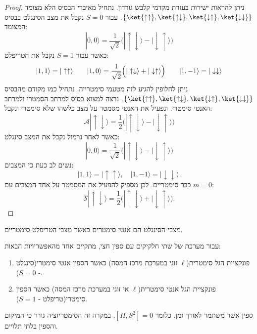 \documentclass{tstextbook}
\begin{document}
\begin{proof}
ניתן להראות ישירות בעזרת מקדמי קלבש גורדון. נתחיל מאיברי הבסיס הלא מצומד \(\{ \ket{\uparrow\uparrow},\ket{\uparrow\downarrow},\ket{\downarrow\uparrow},\ket{\downarrow\downarrow} \}\). עבור \(S=0\) נקבל את מצב הסינגלט בבסיס המצומד:
$$|0,0\rangle=\frac{1}{\sqrt{2}}\Big(|\uparrow\downarrow\rangle-|\downarrow\uparrow\rangle\Big)$$
כאשר עבור \(S=1\) נקבל את הטריפלט:
$$|1,1\rangle=|\uparrow\uparrow\rangle \qquad |1,0\rangle=\frac{1}{\sqrt{2}}\Bigl(|\uparrow\downarrow\rangle+|\downarrow\uparrow\rangle\Bigr)\qquad |1,-1\rangle=|\downarrow\downarrow\rangle$$
ניתן לחלופין להגיע לזה מטעמי סימטרייה. נתחיל כמו מקודם מהבסיס \(\{ \ket{\uparrow\uparrow},\ket{\uparrow\downarrow},\ket{\downarrow\uparrow},\ket{\downarrow\downarrow} \}\). נרצה למצוא בסיס למרחב הסמטרי ולמרחב האנטי סימטרי. ונפעיל את האנטי מסמטר על מצב כלשהו שלא סימטרי ונקבל:
$${\mathcal{A}}|\uparrow\downarrow\rangle={\frac{1}{2}}{\Big(}|\uparrow\downarrow\rangle-|\downarrow\uparrow\rangle{\Big)}$$
כאשר לאחר נרמול נקבל את המצב סינגלט:
$$|0,0\rangle=\frac{1}{\sqrt{2}}\Big(|\!\uparrow\downarrow\rangle-|\!\downarrow\uparrow\rangle\Big)$$
נשים לב כעת כי המצבים:
$$|1,1\rangle=|\!\uparrow\uparrow\rangle,\quad|1,-1\rangle=|\!\downarrow\downarrow\rangle.$$
כבר סימטריים. לכן מספיק להפעיל את המסמטר על אחד המצבים עם \(m=0\):
$${\mathcal{S}}|\!\uparrow\downarrow\rangle={\frac{1}{2}}{\Big(}|\!\uparrow\downarrow\rangle+|\!\downarrow\uparrow\rangle{\Big)}.$$

\end{proof}
\begin{corollary}
מצבי הסינגלט הם אנטי סימטרים כאשר מצבי הטריפלט סימטריים.

\end{corollary}
\begin{corollary}
עבור מערכת של שתי חלקיקים עם ספין חצי, מתקיים אחד מהאפשריויות הבאות:

  \begin{enumerate}
    \item פונקציית הגל סימטרית(\(\ell\) זוגי במערכת מרכז המסה) כאשר הספין אנטי סימטרי(סינגלט - \(S=0\)). 


    \item פונקציית הגל אנטי סימטרית(\(\ell\) אי זוגי במערכת מרכז המסה) כאשר הספין סימטרי(טריפלט - \(S = 1\)). 


  \end{enumerate}
\end{corollary}
\begin{definition}
ספין אשר משתמר לאורך זמן. כלומר \([H,S^{2}]=0\). במקרה זה הסימטריזציה גורר כי המיקום והספין בלתי תלויים.

\end{definition}
\end{document}

